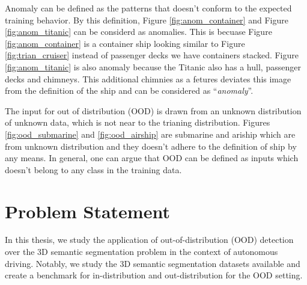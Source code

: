 Anomaly can be defined as the patterns that doesn't conform to the expected training behavior.
By this definition, Figure \ref{fig:anom_container} and Figure \ref{fig:anom_titanic} can be considerd as anomalies.
This is becuase Figure \ref{fig:anom_container} is a container ship looking similar to Figure \ref{fig:trian_cruiser} instead of passenger decks we have containers stacked.
Figure \ref{fig:anom_titanic} is also anomaly because the Titanic also has a hull, passenger decks and chimneys. 
This additional chimnies as a fetures deviates this image from the definition of the ship and can be considered as ``\textit{anomaly}''.

The input for out of distribution (OOD) is drawn from an unknown distribution of unknown data, which is not near to the trianing distribution.
Figures \ref{fig:ood_submarine} and \ref{fig:ood_airship} are submarine and ariship which are from unknown distribution and they doesn't adhere to the definition of ship by any means.
In general, one can argue that OOD can be defined as inputs which doesn't belong to any class in the training data.


\section{Problem Statement}
In this thesis, we study the application of out-of-distribution (OOD) detection over the 3D semantic segmentation problem in the context of autonomous driving.
Notably, we study the 3D semantic segmentation datasets available and create a benchmark for in-distribution and out-distribution for the OOD setting.

